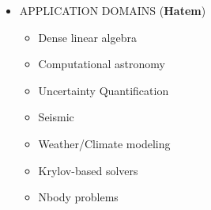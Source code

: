 \begin{itemize}
	\item APPLICATION DOMAINS  (\textbf{Hatem})
		\begin{itemize}
			\item Dense linear algebra
			\item Computational astronomy
			\item Uncertainty Quantification
			\item Seismic
			\item Weather/Climate modeling
			\item Krylov-based solvers
			\item Nbody problems
		\end{itemize}

\end{itemize}
